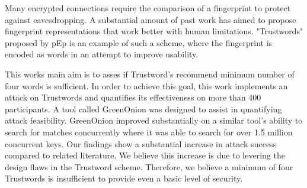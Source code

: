 Many encrypted connections require the comparison of a fingerprint to protect against eavesdropping. A substantial amount of past work has aimed to propose fingerprint representations that work better with human limitations. "Trustwords" proposed by pEp is an example of such a scheme, where the fingerprint is encoded as words in an attempt to improve usability.

This works main aim is to asses if Trustword's recommend minimum number of four words is sufficient.
In order to achieve this goal, this work implements an attack on Trustwords and quantifies its effectiveness on more than 400 participants.  A tool called GreenOnion was designed to assist in quantifying attack feasibility. GreenOnion improved substantially on a similar tool's ability to search for matches concurrently where it was able to search for over 1.5 million concurrent keys. Our findings show a substantial increase in attack success compared to related literature. We believe this increase is due to levering the design flaws in the Trustword scheme. Therefore, we believe a minimum of four Trustwords is insufficient to provide even a basic level of security.